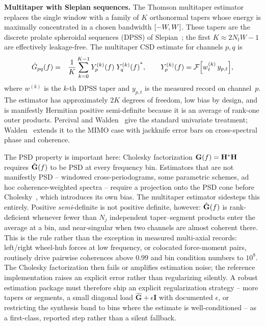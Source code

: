 \documentclass[10pt,a4paper]{article}
\numberwithin{equation}{section}
\DeclarePairedDelimiter\block{[}{]}
\DeclarePairedDelimiter\mat{(}{)}
\begin{document}
\textbf{Multitaper with Slepian sequences.} The Thomson multitaper estimator~\cite{thomson1982multitaper} replaces the single window with a family of $K$ orthonormal tapers whose energy is maximally concentrated in a chosen bandwidth $\block{-W, W}$. These tapers are the discrete prolate spheroidal sequences (DPSS) of Slepian~\cite{slepian1978dpss}; the first $K \approx 2 N_t W - 1$ are effectively leakage-free. The multitaper CSD estimate for channels $p,q$ is
\begin{eqnarray}
\hat G_{p q}\mat{f} &=& \frac{1}{K}\sum_{k=0}^{K-1} Y^{(k)}_{p}\mat{f}\; {Y^{(k)}_{q}\mat{f}}^*, \qquad Y^{(k)}_{p}\mat{f} = \mathcal{F}\block*{w^{(k)}_t\, y_{p, t}},
\end{eqnarray}
where $w^{(k)}$ is the $k$-th DPSS taper and $y_{p, t}$ is the measured record on channel~$p$. The estimator has approximately $2K$ degrees of freedom, low bias by design, and is manifestly Hermitian positive semi-definite because it is an average of rank-one outer products. Percival and Walden~\cite{percival_walden_1993} give the standard univariate treatment; Walden~\cite{walden2000multivariate} extends it to the MIMO case with jackknife error bars on cross-spectral phase and coherence.

The PSD property is important here: Cholesky factorization $\mathbf{G}\mat{f} = \mathbf{H}^*\mathbf{H}$ requires $\hat{\mathbf{G}}\mat{f}$ to be PSD at every frequency bin. Estimators that are not manifestly PSD -- windowed cross-periodograms, some parametric schemes, ad hoc coherence-weighted spectra -- require a projection onto the PSD cone before Cholesky~\cite{higham1988nearest}, which introduces its own bias. The multitaper estimator sidesteps this entirely. Positive \emph{semi}-definite is not positive definite, however: $\hat{\mathbf{G}}\mat{f}$ is rank-deficient whenever fewer than $N_j$ independent taper--segment products enter the average at a bin, and near-singular when two channels are almost coherent there. This is the rule rather than the exception in measured multi-axial records: left/right wheel-hub forces at low frequency, or colocated force-moment pairs, routinely drive pairwise coherences above $0.99$ and bin condition numbers to $10^8$. The Cholesky factorization then fails or amplifies estimation noise; the reference implementation raises an explicit error rather than regularizing silently. A robust estimation package must therefore ship an explicit regularization strategy -- more tapers or segments, a small diagonal load $\hat{\mathbf{G}} + \epsilon\mathbf{I}$ with documented $\epsilon$, or restricting the synthesis band to bins where the estimate is well-conditioned -- as a first-class, reported step rather than a silent fallback.
\end{document}
